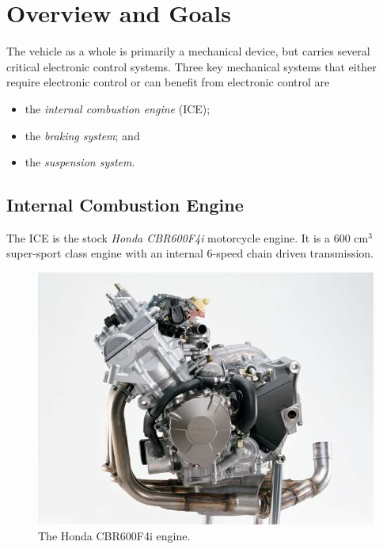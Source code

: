 %
%
%
%

\section{Overview and Goals}

The vehicle as a whole is primarily a mechanical device, but carries several critical electronic control systems. Three key mechanical systems that either require electronic control or can benefit from electronic control are

\begin{itemize}
\item the \emph{internal combustion engine} (ICE); 
\item the \emph{braking system}; and
\item the \emph{suspension system}.
\end{itemize}

\subsection{Internal Combustion Engine}


The ICE is the stock \emph{Honda CBR600F4i} motorcycle engine. It is a 600 cm$^3$ super-sport class engine with an internal 6-speed chain driven transmission. 

\begin{figure}[H]
	\centering
	 	\includegraphics[scale=0.5]{figures/cbr600f4i_engine.png}
    \caption{The Honda CBR600F4i engine.}
    \label{fig:cbr600f4i_engine}
\end{figure}

